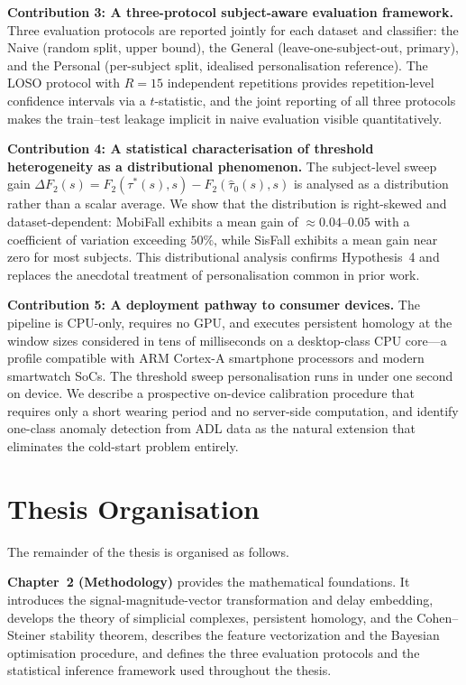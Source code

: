 \documentclass[onluarkali,ingilizce,yukseklisans,karton,LisansustuEgitim]{itutez}
\providecommand{\1}{\mathbf{1}}
\begin{document}
\textbf{Contribution 3: A three-protocol subject-aware evaluation framework.}  Three
evaluation protocols are reported jointly for each dataset and classifier: the Naive
(random split, upper bound), the General (leave-one-subject-out, primary), and the
Personal (per-subject split, idealised personalisation reference).  The LOSO protocol
with $R=15$ independent repetitions provides repetition-level confidence intervals via
a $t$-statistic, and the joint reporting of all three protocols makes the
train--test leakage implicit in naive evaluation visible quantitatively.

\textbf{Contribution 4: A statistical characterisation of threshold heterogeneity
as a distributional phenomenon.}  The subject-level sweep gain
$\Delta F_2(s) = F_2(\tau^*(s), s) - F_2(\hat\tau_0(s), s)$ is analysed as a
distribution rather than a scalar average.  We show that the distribution is
right-skewed and dataset-dependent: MobiFall exhibits a mean gain of ${\approx}0.04$--$0.05$
with a coefficient of variation exceeding $50\%$, while SisFall exhibits a mean gain
near zero for most subjects.  This distributional analysis confirms Hypothesis~4
and replaces the anecdotal treatment of personalisation common in prior work.

\textbf{Contribution 5: A deployment pathway to consumer devices.}  The pipeline
is CPU-only, requires no GPU, and executes persistent homology at the window sizes
considered in tens of milliseconds on a desktop-class CPU core---a profile compatible
with ARM Cortex-A smartphone processors and modern smartwatch SoCs.  The threshold
sweep personalisation runs in under one second on device.  We describe a prospective
on-device calibration procedure that requires only a short wearing period and no
server-side computation, and identify one-class anomaly detection from ADL data as
the natural extension that eliminates the cold-start problem entirely.

\section{Thesis Organisation}
\label{subsec:organisation}

The remainder of the thesis is organised as follows.

\textbf{Chapter~2 (Methodology)} provides the mathematical foundations.  It
introduces the signal-magnitude-vector transformation and delay embedding, develops
the theory of simplicial complexes, persistent homology, and the Cohen--Steiner
stability theorem, describes the feature vectorization and the Bayesian optimisation
procedure, and defines the three evaluation protocols and the statistical inference
framework used throughout the thesis.
\end{document}

